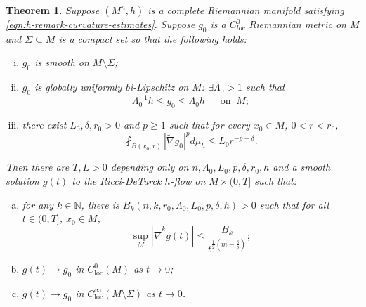 \documentclass[12pt]{amsart}
\newcommand{\hdel}{\tilde{\nabla}}
\newtheorem{thm}{Theorem}[section]
\theoremstyle{remark}
\numberwithin{equation}{section}
\begin{document}
\begin{thm}\label{thm:intro-application-1-statement}
    Suppose $(M^n, h)$ is a complete Riemannian manifold satisfying \eqref{eqn:h-remark-curvature-estimates}. Suppose $g_0$ is a $C^0_{loc}$ Riemannian metric on $M$ and $\Sigma \subseteq M$ is a compact set so that the following holds:
    \begin{enumerate}[(i)]
        \item $g_0$ is smooth on $M \setminus \Sigma$;
        \item $g_0$ is globally uniformly bi-Lipschitz on $M$: 
         $\exists\Lambda_0 > 1$ such that $$\Lambda_0^{-1} h \leq g_0 \leq \Lambda_0 h\;\;\quad\text{on}\;\;M;$$
        \item there exist $L_0,\delta,r_0 > 0$ and $p\geq 1$ such that for every $x_0 \in M$, $0 < r < r_0$,
        \begin{equation*}
            \fint_{B(x_0,r)} |\hdel g_0|^p d\mu_h \leq L_0 r^{-p+\delta}.
        \end{equation*}
    \end{enumerate}
    Then there are $T,L>0$ depending only on  $n, \Lambda_0, L_0, p, \delta, r_0,h$ and a smooth solution $g(t)$ to the Ricci-DeTurck $h$-flow on $M\times(0,T]$ such that:
        \begin{enumerate}[(a)]
            \item for any $k \in \mathbb{N}$, there is $B_k(n, k,r_0, \Lambda_0, L_0, p, \delta,h) > 0$ such that for all $t \in (0, T]$, $x_0 \in M$,
            \begin{equation*}
                \sup\limits_{M}|\hdel^k g(t)| \leq \frac{B_k}{t^{\frac{1}{2}(m-\frac{\delta}{p})}};
            \end{equation*}
            \item $g(t) \to g_0$ in $C_\text{loc}^0(M)$ as $t \to 0$;
            \item $g(t) \to g_0$ in $C_\text{loc}^\infty(M\setminus\Sigma)$ as $t \to 0$.
        \end{enumerate}
\end{thm}
\end{document}

